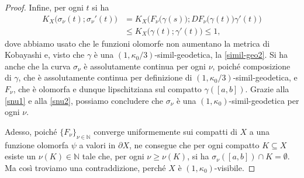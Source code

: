 \begin{proof}
    Infine, per ogni $t$ si ha
    \begin{equation} \label{snu2}
        \begin{aligned}
            K_X\big(\sigma_\nu(t);\sigma_\nu'(t)\big)&=K_X\Big(F_\nu\big(\gamma(s)\big);DF_\nu\big(\gamma(t)\big)\gamma'(t)\Big) \\
            &\le K_X\big(\gamma(t);\gamma'(t)\big) \le 1,
        \end{aligned}
    \end{equation}
    dove abbiamo usato che le funzioni olomorfe non aumentano la metrica di Kobayashi e, visto che $\gamma$ è una $(1,\kappa_0/3)$-simil-geodetica, la \eqref{simil-geo2}. Si ha anche che la curva $\sigma_\nu$ è assolutamente continua per ogni $\nu$, poiché composizione di $\gamma$, che è assolutamente continua per definizione di $(1,\kappa_0/3)$-simil-geodetica, e $F_\nu$, che è olomorfa e dunque lipschitziana sul compatto $\gamma([a,b])$. Grazie alla \eqref{snu1} e alla \eqref{snu2}, possiamo concludere che $\sigma_\nu$ è una $(1,\kappa_0)$-simil-geodetica per ogni $\nu$.
    
    Adesso, poiché $\{F_\nu\}_{\nu\in\mathbb{N}}$ converge uniformemente sui compatti di $X$ a una funzione olomorfa $\psi$ a valori in $\partial X$, ne consegue che per ogni compatto $K\subseteq X$ esiste un $\nu(K)\in\mathbb{N}$ tale che, per ogni $\nu\ge\nu(K)$, si ha $\sigma_\nu([a,b])\cap K=\emptyset$. Ma così troviamo una contraddizione, perché $X$ è $(1,\kappa_0)$-visibile.
\end{proof}